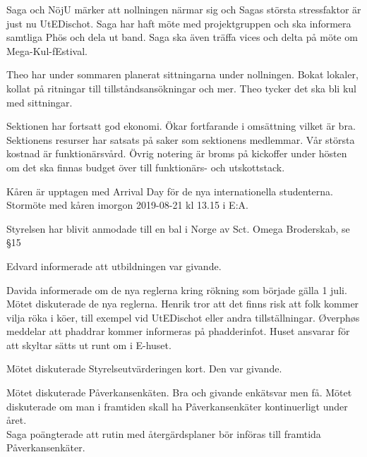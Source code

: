 \documentclass[10pt]{article}
\begin{document}
\begin{paragrafer}
\begin{paragrafer}
Saga och NöjU märker att nollningen närmar sig och Sagas största stressfaktor är just nu UtEDischot. Saga har haft möte med projektgruppen och ska informera samtliga Phös och dela ut band. 
Saga ska även träffa vices och delta på möte om Mega-Kul-fEstival. 


Theo har under sommaren planerat sittningarna under nollningen. Bokat lokaler, kollat på ritningar till tillståndsansökningar och mer. 
Theo tycker det ska bli kul med sittningar.

Sektionen har fortsatt god ekonomi. Ökar fortfarande i omsättning vilket är bra. 
Sektionens resurser har satsats på saker som sektionens medlemmar. Vår största kostnad är funktionärsvård.  
Övrig notering är broms på kickoffer under hösten om det ska finnas budget över till funktionärs- och utskottstack. 

Kåren är upptagen med Arrival Day för de nya internationella studenterna.\\
Stormöte med kåren imorgon 2019-08-21 kl 13.15 i E:A.


Styrelsen har blivit anmodade till en bal i Norge av Sct. Omega Broderskab, se \S15

\end{paragrafer}

Edvard informerade att utbildningen var givande. 

Davida informerade om de nya reglerna kring rökning som började gälla 1 juli. Mötet diskuterade de nya reglerna. Henrik tror att det finns risk att folk kommer vilja röka i köer, till exempel vid UtEDischot eller andra tillställningar. 
Øverphøs meddelar att phaddrar kommer informeras på phadderinfot. Huset ansvarar för att skyltar sätts ut runt om i E-huset.


Mötet diskuterade Styrelseutvärderingen kort. Den var givande. 


Mötet diskuterade Påverkansenkäten. Bra och givande enkätsvar men få. Mötet diskuterade om man i framtiden skall ha Påverkansenkäter kontinuerligt under året. \\
Saga poängterade att rutin med återgärdsplaner bör införas till framtida Påverkansenkäter. 



\end{paragrafer}
\end{document}
